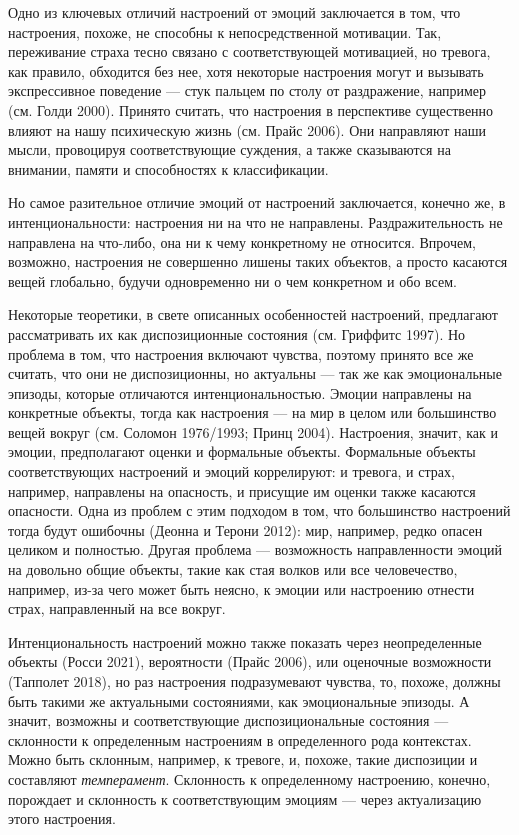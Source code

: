 \documentclass[11pt]{book}
\begin{document}
Одно из ключевых отличий настроений от эмоций заключается в том, что настроения, похоже, не способны к непосредственной мотивации. Так, переживание страха тесно связано с соответствующей мотивацией, но тревога, как правило, обходится без нее, хотя некоторые настроения могут и вызывать экспрессивное поведение --- стук пальцем по столу от раздражение, например (см. Голди 2000). Принято считать, что настроения в перспективе существенно влияют на нашу психическую жизнь (см. Прайс 2006). Они направляют наши мысли, провоцируя соответствующие суждения, а также сказываются на внимании, памяти и способностях к классификации.

Но самое разительное отличие эмоций от настроений заключается, конечно же, в интенциональности: настроения ни на что не направлены. Раздражительность не направлена на что-либо, она ни к чему конкретному не относится. Впрочем, возможно, настроения не совершенно лишены таких объектов, а просто касаются вещей глобально, будучи одновременно ни о чем конкретном и обо всем.

Некоторые теоретики, в свете описанных особенностей настроений, предлагают рассматривать их как диспозиционные состояния (см. Гриффитс 1997). Но проблема в том, что настроения включают чувства, поэтому принято все же считать, что они не диспозиционны, но актуальны --- так же как эмоциональные эпизоды, которые отличаются интенциональностью. Эмоции направлены на конкретные объекты, тогда как настроения --- на мир в целом или большинство вещей вокруг (см. Соломон 1976/1993; Принц 2004). Настроения, значит, как и эмоции, предполагают оценки и формальные объекты. Формальные объекты соответствующих настроений и эмоций коррелируют: и тревога, и страх, например, направлены на опасность, и присущие им оценки также касаются опасности. Одна из проблем с этим подходом в том, что большинство настроений тогда будут ошибочны (Деонна и Терони 2012): мир, например, редко опасен целиком и полностью. Другая проблема --- возможность направленности эмоций на довольно общие объекты, такие как стая волков или все человечество, например, из-за чего может быть неясно, к эмоции или настроению отнести страх, направленный на все вокруг.

Интенциональность настроений можно также показать через неопределенные объекты (Росси 2021), вероятности (Прайс 2006), или оценочные возможности (Тапполет 2018), но раз настроения подразумевают чувства, то, похоже, должны быть такими же актуальными состояниями, как эмоциональные эпизоды. А значит, возможны и соответствующие диспозициональные состояния --- склонности к определенным настроениям в определенного рода контекстах. Можно быть склонным, например, к тревоге, и, похоже, такие диспозиции и составляют \textit{темперамент}. Склонность к определенному настроению, конечно, порождает и склонность к соответствующим эмоциям --- через актуализацию этого настроения.
\end{document}
